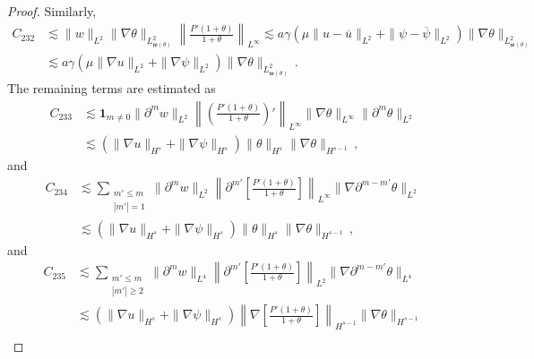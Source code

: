\documentclass[reqno,11pt]{amsart}
\numberwithin{equation}{section}
\def\w{\mathfrak{w}}
\begin{document}
\begin{proof}
Similarly,
\begin{equation}\label{gpsi-eq13}
\begin{aligned}
C_{232}&\lesssim \| w \|_{L^2} \| \nabla \theta \|_{L^2_{\w (\theta)}} \left\| \frac{P'(1+\theta)}{1+\theta} \right\|_{L^\infty} \lesssim a \gamma \left( \mu \| u - \overline{u} \|_{L^2} + \| \psi - \overline{\psi} \|_{L^2} \right) \| \nabla \theta \|_{L^2_{\w (\theta)}} \\&
\lesssim a \gamma \left( \mu \| \nabla u \|_{L^2} + \| \nabla \psi \|_{L^2} \right) \| \nabla \theta \|_{L^2_{\w (\theta)}} \,.
\end{aligned}
\end{equation}
The remaining terms are estimated as
\begin{equation}\label{gpsi-eq14}
\begin{aligned}
C_{233}&\lesssim\mathbf{1}_{m \neq 0} \|\partial^m w\|_{L^2} \left\| \left( \frac{P'(1+\theta)}{1+\theta} \right)' \right\|_{L^\infty}\|\nabla \theta\|_{L^\infty}\|\partial^m \theta\|_{L^2} \\
&\lesssim \left( \|\nabla u\|_{H^s} + \|\nabla \psi\|_{H^s} \right) \|\theta\|_{H^s} \|\nabla \theta\|_{H^{s-1}}
 \,,
\end{aligned}
\end{equation}
and
\begin{equation}\label{gpsi-eq15}
\begin{aligned}
C_{234}&\lesssim \sum_{\substack{m' \leq m \\ |m'|=1}} \|\partial^m w\|_{L^2} \left\| \partial^{m'} \left[ \frac{P'(1+\theta)}{1+\theta} \right] \right\|_{L^\infty} \|\nabla \partial^{m-m'} \theta\|_{L^2} \\
&\lesssim \left( \|\nabla u\|_{H^s} + \|\nabla \psi\|_{H^s} \right) \|\theta\|_{H^s} \|\nabla \theta\|_{H^{s-1}}
 \,,
\end{aligned}
\end{equation}
and
\begin{equation}\label{gpsi-eq16}
\begin{aligned}
C_{235}&\lesssim \sum_{\substack{m' \leq m \\ |m'|\geq 2}} \|\partial^m w\|_{L^4} \left\| \partial^{m'} \left[ \frac{P'(1+\theta)}{1+\theta} \right] \right\|_{L^2} \|\nabla \partial^{m-m'} \theta\|_{L^4} \\
&\lesssim \left( \|\nabla u\|_{H^s} + \|\nabla \psi\|_{H^s} \right) \left\| \nabla \left[ \frac{P'(1+\theta)}{1+\theta} \right] \right\|_{H^{s-1}} \|\nabla \theta\|_{H^{s-1}} \\

\end{aligned}
\end{equation}
\end{proof}
\end{document}
